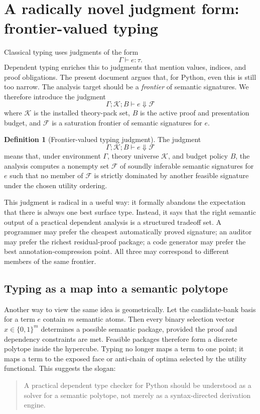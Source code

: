 \documentclass[11pt]{article}
\theoremstyle{definition}
\newtheorem{definition}{Definition}[section]
\theoremstyle{plain}
\begin{document}
\section{A radically novel judgment form: frontier-valued typing}

Classical typing uses judgments of the form
\[
\Gamma \vdash e : \tau.
\]
Dependent typing enriches this to judgments that mention values, indices, and
proof obligations. The present document argues that, for Python, even this is
still too narrow. The analysis target should be a \emph{frontier} of semantic
signatures. We therefore introduce the judgment
\[
\Gamma ; \mathcal{K} ; B \vdash e \Downarrow \mathcal{F}
\]
where $\mathcal{K}$ is the installed theory-pack set, $B$ is the active proof
and presentation budget, and $\mathcal{F}$ is a saturation frontier of semantic
signatures for $e$.

\begin{definition}[Frontier-valued typing judgment]
The judgment
\[
\Gamma ; \mathcal{K} ; B \vdash e \Downarrow \mathcal{F}
\]
means that, under environment $\Gamma$, theory universe $\mathcal{K}$, and
budget policy $B$, the analysis computes a nonempty set $\mathcal{F}$ of soundly
inferable semantic signatures for $e$ such that no member of $\mathcal{F}$ is
strictly dominated by another feasible signature under the chosen utility
ordering.
\end{definition}

This judgment is radical in a useful way: it formally abandons the expectation
that there is always one best surface type. Instead, it says that the right
semantic output of a practical dependent analysis is a structured tradeoff set.
A programmer may prefer the cheapest automatically proved signature; an auditor
may prefer the richest residual-proof package; a code generator may prefer the
best annotation-compression point. All three may correspond to different members
of the same frontier.

\subsection{Typing as a map into a semantic polytope}
Another way to view the same idea is geometrically. Let the candidate-bank basis
for a term $e$ contain $m$ semantic atoms. Then every binary selection vector
$x \in \{0,1\}^m$ determines a possible semantic package, provided the proof and
dependency constraints are met. Feasible packages therefore form a discrete
polytope inside the hypercube. Typing no longer maps a term to one point; it
maps a term to the exposed face or anti-chain of optima selected by the utility
functional. This suggests the slogan:
\begin{quote}
A practical dependent type checker for Python should be understood as a solver
for a semantic polytope, not merely as a syntax-directed derivation engine.
\end{quote}
\end{document}
